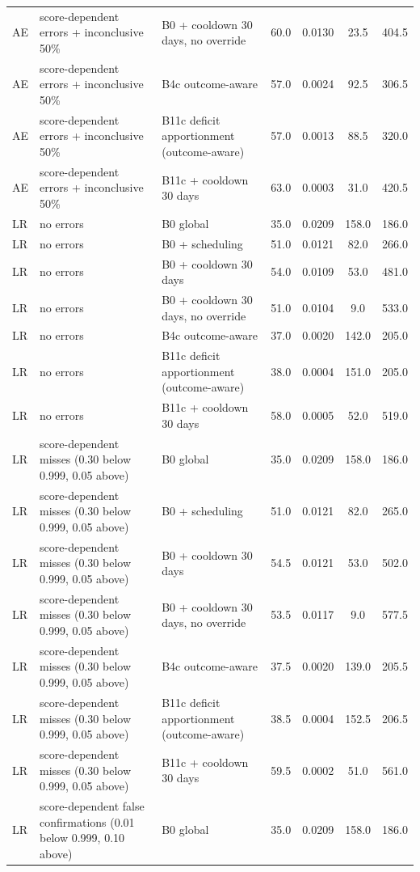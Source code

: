 \documentclass[10pt,onecolumn,letterpaper]{article}
\begin{document}
\begin{longtable}{lp{5.2cm}p{4.4cm}cccc}
AE & score-dependent errors + inconclusive 50\% & B0 + cooldown 30 days, no override & 60.0 & 0.0130 & 23.5 & 404.5 \\
AE & score-dependent errors + inconclusive 50\% & B4c outcome-aware & 57.0 & 0.0024 & 92.5 & 306.5 \\
AE & score-dependent errors + inconclusive 50\% & B11c deficit apportionment (outcome-aware) & 57.0 & 0.0013 & 88.5 & 320.0 \\
AE & score-dependent errors + inconclusive 50\% & B11c + cooldown 30 days & 63.0 & 0.0003 & 31.0 & 420.5 \\
LR & no errors & B0 global & 35.0 & 0.0209 & 158.0 & 186.0 \\
LR & no errors & B0 + scheduling & 51.0 & 0.0121 & 82.0 & 266.0 \\
LR & no errors & B0 + cooldown 30 days & 54.0 & 0.0109 & 53.0 & 481.0 \\
LR & no errors & B0 + cooldown 30 days, no override & 51.0 & 0.0104 & 9.0 & 533.0 \\
LR & no errors & B4c outcome-aware & 37.0 & 0.0020 & 142.0 & 205.0 \\
LR & no errors & B11c deficit apportionment (outcome-aware) & 38.0 & 0.0004 & 151.0 & 205.0 \\
LR & no errors & B11c + cooldown 30 days & 58.0 & 0.0005 & 52.0 & 519.0 \\
LR & score-dependent misses (0.30 below 0.999, 0.05 above) & B0 global & 35.0 & 0.0209 & 158.0 & 186.0 \\
LR & score-dependent misses (0.30 below 0.999, 0.05 above) & B0 + scheduling & 51.0 & 0.0121 & 82.0 & 265.0 \\
LR & score-dependent misses (0.30 below 0.999, 0.05 above) & B0 + cooldown 30 days & 54.5 & 0.0121 & 53.0 & 502.0 \\
LR & score-dependent misses (0.30 below 0.999, 0.05 above) & B0 + cooldown 30 days, no override & 53.5 & 0.0117 & 9.0 & 577.5 \\
LR & score-dependent misses (0.30 below 0.999, 0.05 above) & B4c outcome-aware & 37.5 & 0.0020 & 139.0 & 205.5 \\
LR & score-dependent misses (0.30 below 0.999, 0.05 above) & B11c deficit apportionment (outcome-aware) & 38.5 & 0.0004 & 152.5 & 206.5 \\
LR & score-dependent misses (0.30 below 0.999, 0.05 above) & B11c + cooldown 30 days & 59.5 & 0.0002 & 51.0 & 561.0 \\
LR & score-dependent false confirmations (0.01 below 0.999, 0.10 above) & B0 global & 35.0 & 0.0209 & 158.0 & 186.0 \\

\end{longtable}
\end{document}
